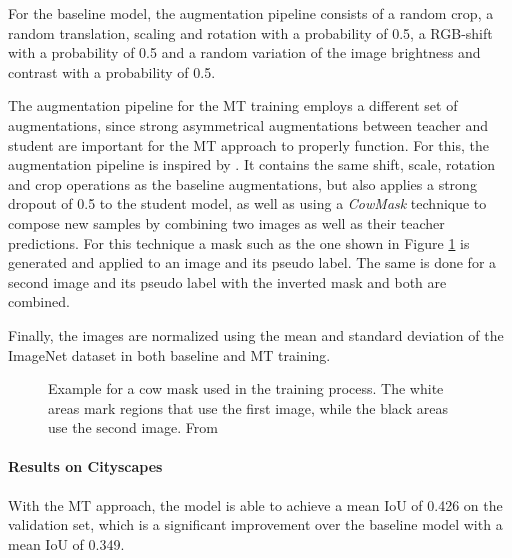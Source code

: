 For the baseline model, the augmentation pipeline consists of a random  crop, a random translation, scaling and rotation with a probability of \num{0.5}, a RGB-shift with a probability of \num{0.5} and a random variation of the image brightness and contrast with a probability of \num{0.5}.  

The augmentation pipeline for the MT training employs a different set of augmentations, since strong asymmetrical augmentations between teacher and student are important for the MT approach to properly function. For this, the augmentation pipeline is inspired by \cite{schererPseudoLabelNoiseSuppression2022}. It contains the same shift, scale, rotation and crop operations as the baseline augmentations, but also applies a strong dropout of \num{0.5} to the student model, as well as using a \emph{CowMask} technique to compose new samples by combining two images as well as their teacher predictions.
For this technique a mask such as the one shown in Figure \ref{fig:cowmask} is generated and applied to an image and its pseudo label. The same is done for a second image and its pseudo label with the inverted mask and both are combined.

Finally, the images are normalized using the mean and standard deviation of the ImageNet dataset in both baseline and MT training.

\begin{figure}[htbp]
    \centering
    \vspace{0.1cm}
    \caption{Example for a cow mask used in the training process. The white areas mark regions that use the first image, while the black areas use the second image. From \cite{schererPseudoLabelNoiseSuppression2022}}
    \label{fig:cowmask}
\end{figure}

\paragraph{Results on Cityscapes}
With the MT approach, the model is able to achieve a mean IoU of \num{0.426} on the validation set, which is a significant improvement over the baseline model with a mean IoU of \num{0.349}.

